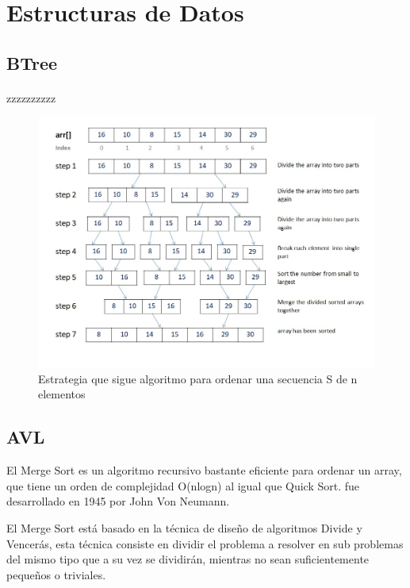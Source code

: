 \documentclass{article}
\begin{document}
	\section{Estructuras de Datos} 
        \subsection{BTree}
            \paragraph{}
   zzzzzzzzzz
            \begin{figure}[h!]
                \centering
                \includegraphics[width=12cm]{img/mergesort.png}
                \caption{Estrategia que sigue algoritmo para ordenar una secuencia S de n elementos}
                \label{fig:mergesort}
            \end {figure} 

        \subsection{AVL}
        
         El Merge Sort es un algoritmo recursivo bastante eficiente para ordenar un array, que tiene un orden de complejidad O(nlogn) al igual que Quick Sort. fue desarrollado en 1945 por John Von Neumann.

         El Merge Sort está basado en la técnica de diseño de algoritmos Divide y Vencerás, esta técnica consiste en dividir el problema a resolver en sub problemas del mismo tipo que a su vez se dividirán, mientras no sean suficientemente  pequeños o triviales.
            
\end{document}

